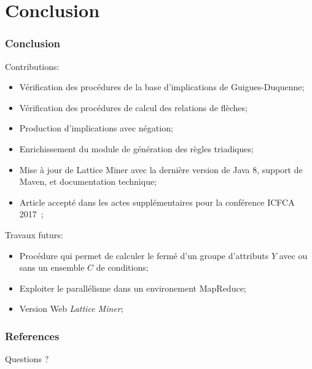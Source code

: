 \documentclass[french]{beamer}
\begin{document}



\section{Conclusion}
\begin{frame}
\frametitle{Conclusion}
Contributions:
\begin{itemize}
\item Vérification des procédures de la base d'implications de Guigues-Duquenne;
\item Vérification des procédures de calcul des relations de flèches;
\item Production d'implications avec négation;
\item Enrichissement du module de génération des règles triadiques;
\item Mise à jour de Lattice Miner avec la dernière version de Java 8, support de Maven, et documentation technique;
\item Article accepté dans les actes supplémentaires pour la conférence ICFCA 2017~\parencite{Missaoui2017};
\end{itemize}
Travaux futurs:
\begin{itemize}
\item Procédure qui permet de calculer le fermé d'un groupe d'attributs $Y$ avec ou sans un ensemble $C$ de conditions;
\item Exploiter le parallélisme dans un environement MapReduce;
\item Version Web \emph{Lattice Miner};
\end{itemize}
\end{frame}
\begin{frame}[allowframebreaks]
\frametitle{References}
\printbibliography
\end{frame}
\begin{frame}
\Huge{\centerline{Questions ?}}
\end{frame}
\end{document}

